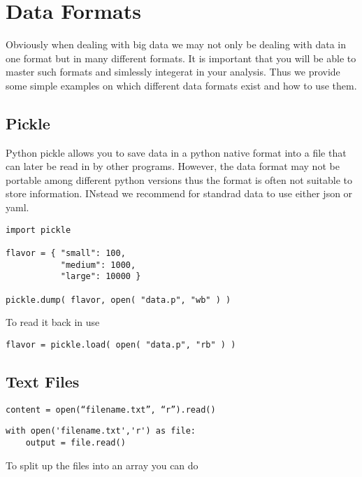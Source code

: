 \FILENAME

\chapter{Data Formats}

Obviously when dealing with big data we may not only be dealing with
data in one format but in many different formats. It is important that
you will be able to master such formats and simlessly integerat in
your analysis. Thus we provide some simple examples on which different
data formats exist and how to use them.

\section{Pickle}

Python pickle allows you to save data in a python native format into a file
that can later be read in by other programs. However, the data format
may not be portable among different python versions thus the format is
often not suitable to store information. INstead we recommend for
standrad data to use either json or yaml.

\begin{verbatim}
import pickle

flavor = { "small": 100, 
           "medium": 1000,
           "large": 10000 }

pickle.dump( flavor, open( "data.p", "wb" ) )

\end{verbatim}

To read it back in use

\begin{verbatim}
flavor = pickle.load( open( "data.p", "rb" ) )
\end{verbatim}

\section{Text Files}

\begin{verbatim}
content = open(“filename.txt”, “r”).read() 
\end{verbatim}

\begin{verbatim}
with open('filename.txt','r') as file:
    output = file.read()
\end{verbatim}

To split up the files into an array you can do

